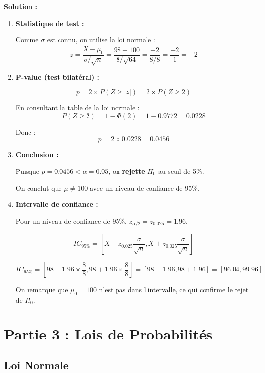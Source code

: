 \documentclass[11pt,a4paper]{article}
\begin{document}
\textbf{Solution :}

\begin{enumerate}
    \item \textbf{Statistique de test :}
    
    Comme $\sigma$ est connu, on utilise la loi normale :
    $$z = \frac{\overline{X} - \mu_0}{\sigma/\sqrt{n}} = \frac{98 - 100}{8/\sqrt{64}} = \frac{-2}{8/8} = \frac{-2}{1} = -2$$
    
    \item \textbf{P-value (test bilatéral) :}
    
    $$p = 2 \times P(Z \geq |z|) = 2 \times P(Z \geq 2)$$
    
    En consultant la table de la loi normale :
    $$P(Z \geq 2) = 1 - \Phi(2) = 1 - 0.9772 = 0.0228$$
    
    Donc : $$p = 2 \times 0.0228 = 0.0456$$
    
    \item \textbf{Conclusion :}
    
    Puisque $p = 0.0456 < \alpha = 0.05$, on \textbf{rejette $H_0$} au seuil de 5\%.
    
    On conclut que $\mu \neq 100$ avec un niveau de confiance de 95\%.
    
    \item \textbf{Intervalle de confiance :}
    
    Pour un niveau de confiance de 95\%, $z_{\alpha/2} = z_{0.025} = 1.96$.
    
    $$IC_{95\%} = \left[\overline{X} - z_{0.025} \frac{\sigma}{\sqrt{n}}, \overline{X} + z_{0.025} \frac{\sigma}{\sqrt{n}}\right]$$
    
    $$IC_{95\%} = \left[98 - 1.96 \times \frac{8}{8}, 98 + 1.96 \times \frac{8}{8}\right] = [98 - 1.96, 98 + 1.96] = [96.04, 99.96]$$
    
    On remarque que $\mu_0 = 100$ n'est pas dans l'intervalle, ce qui confirme le rejet de $H_0$.
\end{enumerate}

\newpage

\section{Partie 3 : Lois de Probabilités}

\subsection{Loi Normale}
\end{document}
